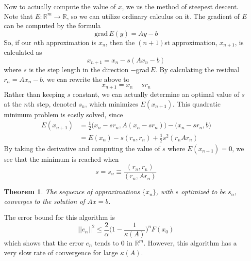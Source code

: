 \documentclass{article}
\newtheorem{theorem}{Theorem}[section]
\theoremstyle{remark}
\theoremstyle{definition}
\begin{document}
Now to actually compute the value of $x$, we us the method of steepest descent. Note that $E: \mathbb{R}^m \longrightarrow \mathbb{R}$, so we can utilize ordinary calculus on it. The gradient of $E$ can be computed by the formula 
\[\text{grad}\,E(y) = A y - b\]
So, if our $n$th approximation is $x_n$, then the $(n+1)$st approximation, $x_{n+1}$, is calculated as
\[x_{n+1} = x_n - s (Ax_n - b)\]
where $s$ is the step length in the direction $-$grad$\,E$. By calculating the residual $r_n = A x_n - b$, we can rewrite the above to
\[x_{n+1} = x_n - s r_n\]
Rather than keeping $s$ constant, we can actually determine an optimal value of $s$ at the $n$th step, denoted $s_n$, which minimizes $E(x_{n+1})$. This quadratic minimum problem is easily solved, since
\begin{align*}
    E(x_{n+1}) & = \frac{1}{2} \big(x_n - s r_n, A(x_n - s r_n) \big) - \big( x_n - s r_n, b\big) \\
    & = E(x_n) - s (r_n, r_n) + \frac{1}{2} s^2 (r_n A r_n)
\end{align*}
By taking the derivative and computing the value of $s$ where $E (x_{n+1}) = 0$, we see that the minimum is reached when 
\[s = s_n \equiv \frac{(r_n, r_n)}{(r_n, A r_n)}\]

\begin{theorem}
The sequence of approximations $\{x_n\}$, with $s$ optimized to be $s_n$, converges to the solution of $A x = b$. 
\end{theorem}

The error bound for this algorithm is 
\[||e_n||^2 \leq \frac{2}{\alpha} \bigg( 1-\frac{1}{\kappa(A)} \bigg)^n F(x_0)\]
which shows that the error $e_n$ tends to $0$ in $\mathbb{R}^m$. However, this algorithm has a very slow rate of convergence for large $\kappa(A)$. 
\end{document}
